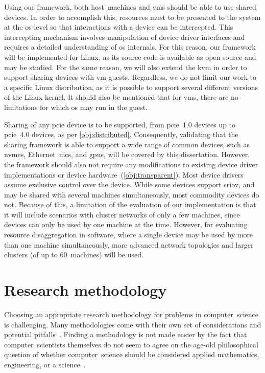 Using our framework, both \gls{host}~machines and \glspl{vm} should be able to use shared devices.
%
In order to accomplish this, resources must to be presented to the system at the \gls{os}-level so that interactions with a device can be intercepted. 
%
This intercepting mechanism involves manipulation of device driver interfaces and requires a detailed understanding of \gls{os} internals.
%
For this reason, our framework will be implemented for Linux, as its source code is available as open source and may be studied.
%
For the same reason, we will also extend the \gls{kvm} in order to support sharing devices with \gls{vm} \glspl{guest}.
%
Regardless, we do not limit our work to a specific Linux distribution, as it is possible to support several different versions of the Linux kernel.
%
It should also be mentioned that for \glspl{vm}, there are no limitations for which \gls{os} may run in the \gls{guest}.



Sharing of any \gls{pcie} device is to be supported, from \gls{pcie}~1.0 devices up to \gls{pcie}~4.0 devices, as per \cref{obj:distributed}.
%
Consequently, validating that the sharing framework is able to support a wide range of common devices, such as \glspl{nvme}, Ethernet~\glspl{nic}, and \glspl{gpu}, will be covered by this dissertation.
%
However, the framework should also not require any modifications to existing device driver implementations or device hardware~(\cref{obj:transparent}).
%
Most device drivers assume exclusive control over the device.
%
While some devices support \gls{sriov}, and may be shared with several machines simultaneously, most commodity devices do not.
%
Because of this, a limitation of the evaluation of our implementation is that it will include scenarios with cluster networks of only a few machines, since devices can only be used by one machine at the time.
%
However, for evaluating resource \gls{disaggregation} in software, where a single device may be used by more than one machine simultaneously, more advanced network topologies and larger clusters (of up to 60~machines) will be used.


\section{Research methodology}\label{sec:methodology}
Choosing an appropriate research methodology for problems in computer~science is challenging.
%
Many methodologies come with their own set of considerations and potential pitfalls~\cite{McGrath1981}.
%
Finding a methodology is not made easier by the fact that computer~scientists themselves do not seem to agree on the age-old philosophical question of whether computer~science should be considered applied mathematics, engineering, or a science~\cite{Denning2005}.



